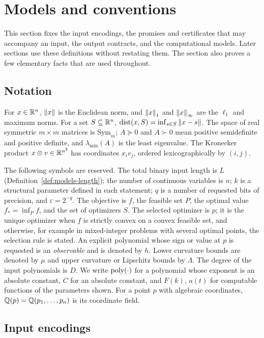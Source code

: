 \section{Models and conventions}
\label{sec:models}

This section fixes the input encodings, the promises and certificates that
may accompany an input, the output contracts, and the computational models.
Later sections use these definitions without restating them. The section
also proves a few elementary facts that are used throughout.

\subsection{Notation}
\label{sec:models-notation}

For $x\in\mathbb R^n$, $\left\lVert x\right\rVert$ is the Euclidean norm, and $\left\lVert x\right\rVert_1$ and
$\left\lVert x\right\rVert_\infty$ are the $\ell_1$ and maximum norms. For a set
$S\subseteq\mathbb R^n$, $\operatorname{dist}(x,S)=\inf_{s\in S}\left\lVert x-s\right\rVert$. The space of real
symmetric $m\times m$ matrices is $\mathrm{Sym}_m$; $A\succeq0$ and $A\succ0$
mean positive semidefinite and positive definite, and $\lambda_{\min}(A)$ is
the least eigenvalue. The Kronecker product $x\otimes v\in\mathbb R^{n^2}$ has
coordinates $x_iv_j$, ordered lexicographically by $(i,j)$.

The following symbols are reserved. The total binary input length is $L$
(Definition~\ref{def:models-length}); the number of continuous variables is
$n$; $k$ is a structural parameter defined in each statement; $q$ is a
number of requested bits of precision, and $\varepsilon=2^{-q}$. The objective
is $f$, the feasible set $P$, the optimal value $f_*=\inf_Pf$, and the set of
optimizers $S$. The selected optimizer is $p$; it is the unique optimizer
when $f$ is strictly convex on a convex feasible set, and otherwise, for
example in mixed-integer problems with several optimal points, the selection
rule is stated. An
explicit polynomial whose sign or value at $p$ is requested is an
\emph{observable} and is denoted by $h$. Lower curvature bounds are denoted
by $\mu$ and upper curvature or Lipschitz bounds by $\Lambda$. The degree of
the input polynomials is $D$. We write $\operatorname{poly}(\cdot)$ for a polynomial whose
exponent is an absolute constant, $C$ for an absolute constant, and $F(k)$,
$a(t)$ for computable functions of the parameters shown. For a point $p$ with
algebraic coordinates, $\mathbb Q(p)=\mathbb Q(p_1,\ldots,p_n)$ is its coordinate field.

\subsection{Input encodings}
\label{sec:models-input}

